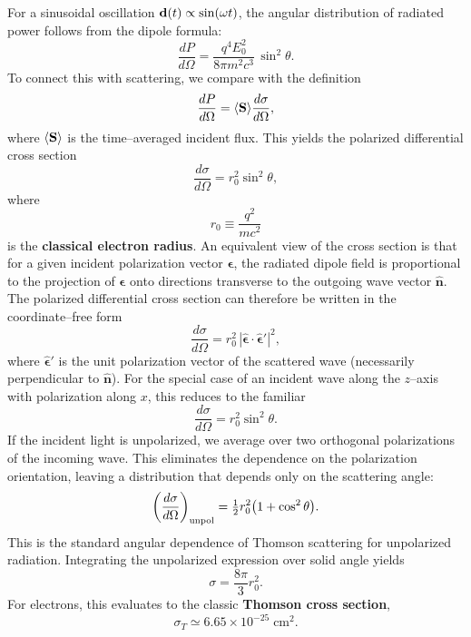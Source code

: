 \noindent
For a sinusoidal oscillation ${\bf d}(t) \propto \sin(\omega t)$, the
angular distribution of radiated power follows from the dipole formula:
\[
    \frac{dP}{d\Omega} = \frac{q^4E_0^2}{8\pi m^2 c^3}\,\sin^2\theta.
\]
To connect this with scattering, we compare with the definition
\[
    \frac{dP}{d\Omega} = \langle {\bf S} \rangle \frac{d\sigma}{d\Omega},
\]
where $\langle {\bf S} \rangle$ is the time--averaged incident flux.
This yields the polarized differential cross section
\[
    \frac{d\sigma}{d\Omega} = r_0^2 \sin^2\theta,
\]
where
\[
    r_0 \equiv \frac{q^2}{mc^2}
\]
is the \textbf{classical electron radius}. An equivalent view of the cross section is that
for a given incident polarization vector $\boldsymbol{\epsilon}$, the radiated dipole field is proportional to the projection of
$\boldsymbol{\epsilon}$ onto directions transverse to the outgoing wave vector $\hat{\mathbf{n}}$. The polarized differential cross section can
therefore be written in the coordinate--free form
\[
    \frac{d\sigma}{d\Omega} = r_0^2 \, |\hat{\boldsymbol{\epsilon}} \cdot \hat{\boldsymbol{\epsilon}}'|^2,
\]
where $\hat{\boldsymbol{\epsilon}}'$ is the unit polarization vector of the scattered wave (necessarily perpendicular to $\hat{\mathbf{n}}$).
For the special case of an incident wave along the $z$--axis with polarization along $x$, this reduces to the familiar
\[
    \frac{d\sigma}{d\Omega} = r_0^2 \sin^2\theta.
\]
If the incident light is unpolarized, we average over two orthogonal polarizations of the incoming wave. This eliminates the dependence on the polarization orientation, leaving a distribution that depends only
on the scattering angle:
\[
    \left(\frac{d\sigma}{d\Omega}\right)_{\rm unpol}
    = \tfrac{1}{2} r_0^2 \big(1 + \cos^2\theta\big).
\]
This is the standard angular dependence of Thomson scattering for unpolarized radiation. Integrating the unpolarized expression over solid angle yields
\begin{equation}
    \label{eq:thomson_cross_section}
    \boxed{\sigma = \frac{8\pi}{3} r_0^2.}
\end{equation}
For electrons, this evaluates to the classic \textbf{Thomson cross
section},
\[
    \sigma_T \simeq 6.65 \times 10^{-25}\;\mathrm{cm}^2.
\]


